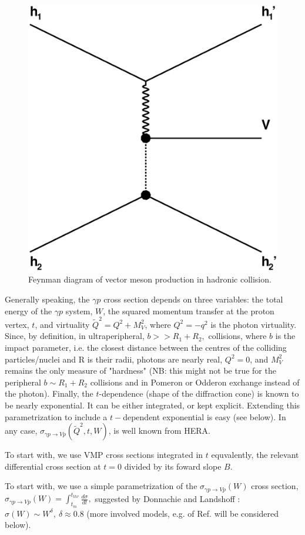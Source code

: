 \documentclass[12pt]{article}
\begin{document}
\begin{figure}[!h]
\centering
 \includegraphics[width=.4\textwidth]{figures/exclusive_vmp.eps}
 \caption{Feynman diagram of vector meson production in hadronic collision.}
 \label{fig:vmp_feynman}
\end{figure}

Generally speaking, the $\gamma p$ cross section depends on three variables: the total energy of the $\gamma p$ system, $W$,
the squared momentum transfer at the proton vertex, $t$, and virtuality $\tilde Q^2=Q^2+M_V^2$, where $Q^2=-q^2$ is the photon virtuality. Since, by definition, in ultraperipheral, $b>>R_1+R_2,$
collisions, where $b$ is the impact parameter, i.e. the closest distance between the centres of the colliding particles/nuclei and R is their radii,
photons are nearly real, $Q^2=0$, and $M_V^2$ remains the only measure of "hardness" (NB: this might not be true for the peripheral $b\sim R_1+R_2$ collisions and in
Pomeron or Odderon exchange instead of the photon). Finally, the $t$-dependence (shape of the diffraction cone) is known to be nearly exponential. It can be either integrated, or
kept explicit. Extending this parametrization to include a $t-$dependent exponential is easy (see below).
In any case, $\sigma_{\gamma p\rightarrow Vp}(\tilde Q^2, t, W)$, is well known from HERA.

To start with, we use VMP cross sections integrated in $t$ equvalently, the relevant differential cross section
at $t=0$ divided by its foward slope $B$.


To start with, we use a simple parametrization of the $\sigma_{\gamma p\rightarrow Vp}(W)$ cross section, $\sigma_{\gamma p\rightarrow Vp}(W)=\int_{t_m}^{t_{thr}}\frac{d\sigma}{dt},$
suggested by Donnachie and Landshoff \cite{DL}: $\sigma(W)\sim W^{\delta},\ \delta\approx 0.8$ (more involved models, e.g. of Ref. \cite{Capua, Fazio} will be considered below).
\end{document}

